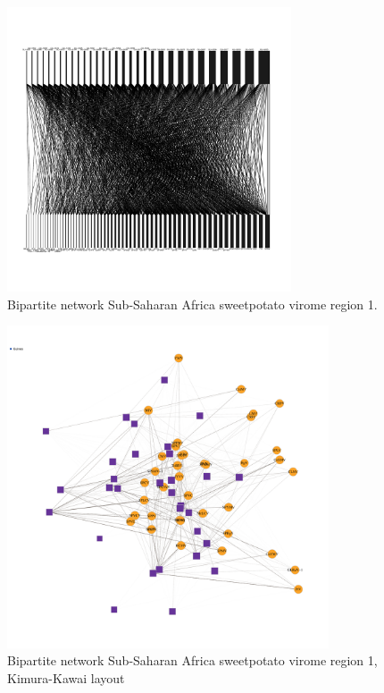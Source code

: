 \documentclass{article}
\begin{document}
\begin{figure}[h!]
\begin{center}
\includegraphics[width=0.75\textwidth]{../results/k-cluster2/2-kcluster_bipartitenetwork_Feb28.pdf
} %
\caption{Bipartite network Sub-Saharan Africa sweetpotato virome region 1.}
\end{center}
\end{figure}



\begin{figure}[h!]
\begin{center}
\includegraphics[width=0.85\textwidth]{../results/k-cluster2/2-kcluster_bipartitenetwork-kk_Feb28.pdf
} %
\caption{Bipartite network Sub-Saharan Africa sweetpotato virome region 1, Kimura-Kawai layout}
\end{center}
\end{figure}
\end{document}
